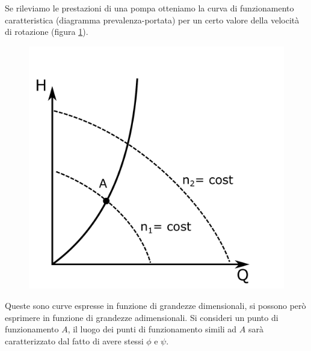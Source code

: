 Se rileviamo le prestazioni di una pompa otteniamo la curva di funzionamento caratteristica (diagramma prevalenza-portata) per un certo valore della velocità di rotazione (figura \ref{fig:hq}).

\begin{figure}[h!]
\centering
  \includegraphics[width=.3\textwidth]{fig/hq.pdf}
\caption{}
\label{fig:hq}
\end{figure}

Queste sono curve espresse in funzione di grandezze dimensionali, si possono però esprimere in funzione di grandezze adimensionali. Si consideri un punto di funzionamento $A$, il luogo dei punti di funzionamento simili ad $A$ sarà caratterizzato dal fatto di avere stessi $\phi$ e $\psi$.

